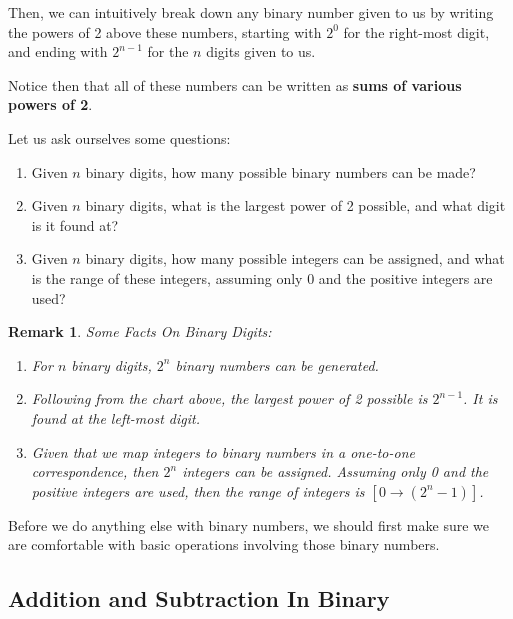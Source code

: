 \documentclass[12pt]{article}
\newtheorem*{remark}
{Remark}
\begin{document}
    Then, we can intuitively break down any binary number given to us by writing
    the powers of 2 above these numbers, starting with $2^0$ for the right-most digit,
    and ending with $2^{n - 1}$ for the $n$ digits given to us.

    Notice then that all of these numbers can be written as \textbf{sums of various powers of 2}.

    Let us ask ourselves some questions:

    \begin{enumerate}
        \item Given $n$ binary digits, how many possible binary numbers can be made?
        \item Given $n$ binary digits, what is the largest power of 2 possible, and what digit
        is it found at?
        \item Given $n$ binary digits, how many possible integers can be assigned, and what
        is the range of these integers, assuming only 0 and the positive integers are used?
    \end{enumerate}
    

    \begin{remark} Some Facts On Binary Digits:
            \begin{enumerate}
                \item For $n$ binary digits, $2^n$ binary numbers can be generated.
                \item Following from the chart above, the largest power of 2 possible is
                $2^{n - 1}$. It is found at the left-most digit.
                \item Given that we map integers to binary numbers in a one-to-one correspondence,
                then $2^n$ integers can be assigned. Assuming only 0 and the positive integers are used,
                then the range of integers is $[0 \rightarrow (2^{n} - 1)]$.
            \end{enumerate}
        \end{remark}


        
Before we do anything else with binary numbers, we should first make sure we are comfortable with
basic operations involving those binary numbers.

\subsection*{Addition and Subtraction In Binary}
\end{document}
